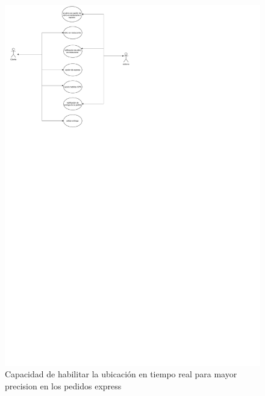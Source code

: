 \documentclass[conference]{IEEEtran}
\begin{document}
\begin{figure}[H]
\centering
\includegraphics[scale=0.23]{imagenes/requerimiento .pdf}
\caption{Capacidad de habilitar la ubicación en tiempo real para mayor precision en los pedidos express}
\end{figure}
\end{document}
